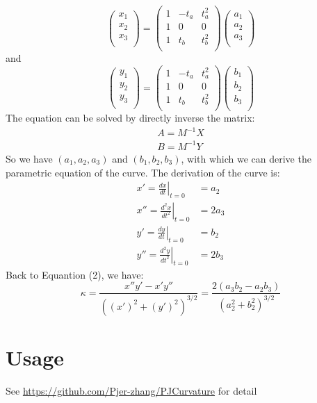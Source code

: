 \documentclass{article}
\begin{document}
	 \begin{equation}
	 \left( \begin{matrix} x_1\\ x_2\\ x_3\\ \end{matrix} \right) = \left( \begin{matrix} 1& -t_a &t_a^2\\ 1& 0 & 0\\ 1& t_b& t_b^2\\ \end{matrix} \right) \left( \begin{matrix} a_1\\ a_2\\ a_3\\ \end{matrix} \right) 
	 \end{equation}
	 and
	 \begin{equation}
	 \left( \begin{matrix} y_1\\ y_2\\ y_3\\ \end{matrix} \right) = \left( \begin{matrix} 1& -t_a &t_a^2\\ 1& 0 & 0\\ 1& t_b& t_b^2\\ \end{matrix} \right) \left( \begin{matrix} b_1\\ b_2\\ b_3\\ \end{matrix} \right) 
	 \end{equation}
	 The equation can be solved by directly inverse the matrix:
	 \begin{align}
	 A = M^{-1}X\\ B = M^{-1}Y
	 \end{align}
	 So we have $(a_1,a_2,a_3)$ and $(b_1,b_2,b_3)$, with which we can derive the parametric equation of the curve. The derivation of the curve is:
	 \begin{align*}
	 x'= \left.\frac{dx}{dt}\right|_{t=0}& = a_2\\ x''= \left.\frac{d^2x}{dt^2}\right|_{t=0}& =2 a_3\\ y'= \left.\frac{dy}{dt}\right|_{t=0}& = b_2\\ y''= \left.\frac{d^2y}{dt^2}\right|_{t=0}& =2 b_3
	 \end{align*}
	 Back to Equantion (2), we have:
	 \begin{equation}
	 \kappa = \frac{x''y'-x'y''}{\left( (x')^2+(y')^2\right)^{3/2}} = \frac{2(a_3 b_2-a_2 b_3)}{(a_2^2+b_2^2)^{3/2}}
	 \end{equation}
	 \section{Usage}
	See \url{https://github.com/Pjer-zhang/PJCurvature} for detail
\end{document}
